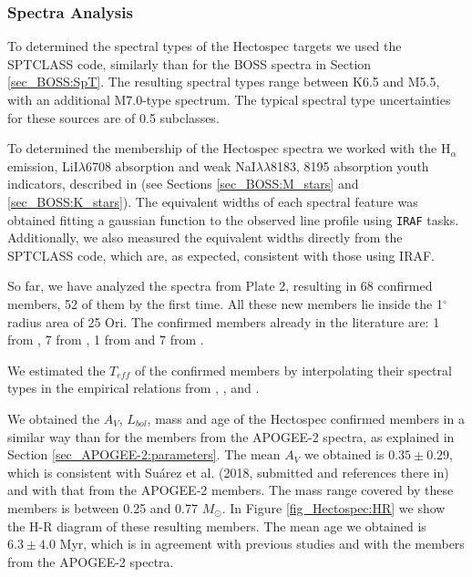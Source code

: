 \documentclass[12pt]{article}
\newcounter{subsubsubsection}[subsubsection]
\begin{document}
\subsubsection{Spectra Analysis}
\label{sec_Hectospec:analysis}

\label{sec_Hectospec:SpT}
To determined the spectral types of the Hectospec targets we used the SPTCLASS code, similarly than for the BOSS spectra in Section \ref{sec_BOSS:SpT}. The resulting spectral types range between K6.5 and M5.5, with an additional M7.0-type spectrum. The typical spectral type uncertainties for these sources are of 0.5 subclasses.

\label{sec_Hectospec:membership}
To determined the membership of the Hectospec spectra we worked with the H$_\alpha$ emission, LiI$\lambda$6708 absorption and weak NaI$\lambda\lambda$8183, 8195 absorption youth indicators, described in \citet{Suarez2017} (see Sections \ref{sec_BOSS:M_stars} and \ref{sec_BOSS:K_stars}). The equivalent widths of each spectral feature was obtained fitting a gaussian function to the observed line profile using \texttt{IRAF} tasks. Additionally, we also measured the equivalent widths directly from the SPTCLASS code, which are, as expected, consistent with those using IRAF.

So far, we have analyzed the spectra from Plate 2, resulting in 68 confirmed members, 52 of them by the first time. All these new members lie inside the 1$^\circ$ radius area of 25 Ori. The confirmed members already in the literature are: 1 from \citet{Briceno2007}, 7 from \citet{Downes2014}, 1 from \citet{Suarez2017} and 7 from \citet{Briceno2018}.

\label{sec_Hectospec:parameters}
We estimated the $T_{eff}$ of the confirmed members by interpolating their spectral types in the empirical relations from \citet{Kenyon-Hartmann1995}, \citet{Luhman1999}, \citet{Briceno2002} and \citet{Luhman2003b}.

We obtained the $A_V$, $L_{bol}$, mass and age of the Hectospec confirmed members in a similar way than for the members from the APOGEE-2 spectra, as explained in Section \ref{sec_APOGEE-2:parameters}. The mean $A_V$ we obtained is $0.35\pm0.29$, which is consistent with Su\'arez et al. (2018, submitted and references there in) and with that from the APOGEE-2 members. The mass range covered by these members is between 0.25 and 0.77 $M_\odot$. In Figure \ref{fig_Hectospec:HR} we show the H-R diagram of these resulting members. The mean age we obtained is $6.3\pm4.0$ Myr, which is in agreement with previous studies \citep[][ and references there in]{Briceno2018} and with the members from the APOGEE-2 spectra.
\end{document}

